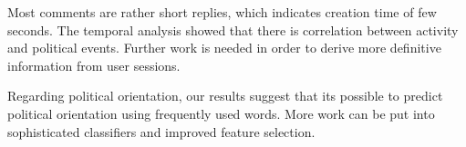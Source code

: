 \documentclass[runningheads,a4paper]{llncs}
\begin{document}
	Most comments are rather short replies, which indicates creation time of few seconds. 
	The temporal analysis showed that there is correlation between activity and political events. Further work is needed in order to derive more definitive information from user sessions.
	\par
	Regarding political orientation, our results suggest that its possible to predict political orientation using frequently used words. More work can be put into sophisticated classifiers and improved feature selection.
	
	\nocite{*}
	
	
	
\end{document}
